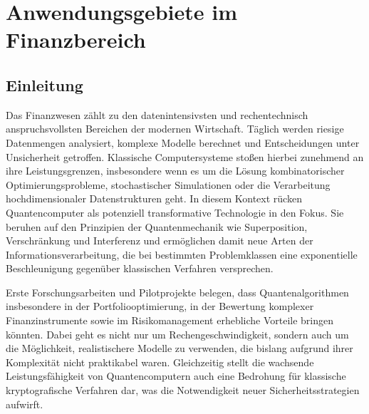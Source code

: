 \chapter{Anwendungsgebiete im Finanzbereich}
\label{trends} %



\section{Einleitung}
Das Finanzwesen zählt zu den datenintensivsten und rechentechnisch anspruchsvollsten Bereichen der modernen Wirtschaft. Täglich werden riesige Datenmengen analysiert, komplexe Modelle berechnet und Entscheidungen unter Unsicherheit getroffen. Klassische Computersysteme stoßen hierbei zunehmend an ihre Leistungsgrenzen, insbesondere wenn es um die Lösung kombinatorischer Optimierungsprobleme, stochastischer Simulationen oder die Verarbeitung hochdimensionaler Datenstrukturen geht. In diesem Kontext rücken Quantencomputer als potenziell transformative Technologie in den Fokus. Sie beruhen auf den Prinzipien der Quantenmechanik wie Superposition, Verschränkung und Interferenz und ermöglichen damit neue Arten der Informationsverarbeitung, die bei bestimmten Problemklassen eine exponentielle Beschleunigung gegenüber klassischen Verfahren versprechen.

Erste Forschungsarbeiten und Pilotprojekte belegen, dass Quantenalgorithmen insbesondere in der Portfoliooptimierung, in der Bewertung komplexer Finanzinstrumente sowie im Risikomanagement erhebliche Vorteile bringen könnten. Dabei geht es nicht nur um Rechengeschwindigkeit, sondern auch um die Möglichkeit, realistischere Modelle zu verwenden, die bislang aufgrund ihrer Komplexität nicht praktikabel waren. Gleichzeitig stellt die wachsende Leistungsfähigkeit von Quantencomputern auch eine Bedrohung für klassische kryptografische Verfahren dar, was die Notwendigkeit neuer Sicherheitsstrategien aufwirft.

